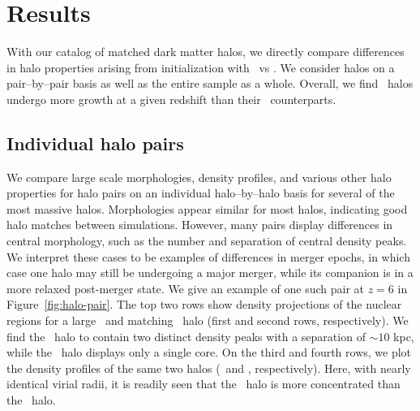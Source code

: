 
%
%

\section{Results}
\label{sec:2lpt--results}



With our catalog of matched dark matter halos, we directly compare differences in halo properties arising from initialization with \lpt\ vs \za.  We consider halos on a pair--by--pair basis as well as the entire sample as a whole.  Overall, we find \lpt\ halos undergo more growth at a given redshift than their \za\ counterparts.




\subsection{Individual halo pairs}


We compare large scale morphologies, density profiles, and various other halo properties for halo pairs on an individual halo--by--halo basis for several of the most massive halos.  Morphologies appear similar for most halos, indicating good halo matches between simulations.  However, many pairs display differences in central morphology, such as the number and separation of central density peaks.  We interpret these cases to be examples of differences in merger epochs, in which case one halo may still be undergoing a major merger, while its companion is in a more relaxed post-merger state.  We give an example of one such pair at $z = 6$ in Figure~\ref{fig:halo-pair}.  The top two rows show density projections of the nuclear regions for a large \lpt\ and matching \za\ halo (first and second rows, respectively).  We find  the \za\ halo to contain two distinct density peaks with a separation of $\sim 10$ kpc, while the \lpt\ halo displays only a single core.  On the third and fourth rows, we plot the density profiles of the same two halos (\lpt\ and \za, respectively).  Here, with nearly identical virial radii, it is readily seen that the \lpt\ halo is more concentrated than the \za\ halo.




